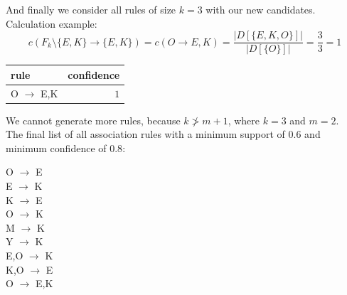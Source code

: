 \documentclass{article}
\begin{document}
  And finally we consider all rules of size $k=3$ with our new candidates. \\

  Calculation example:
  $$c({F}_k \setminus \{E,K\} \to \{E,K\}) = c(O \to E,K) = \dfrac{|D[\{E, K, O\}]|}{|D[\{O\}]|} = \dfrac{3}{3} = 1$$

  \begin{center}
    \begin{tabular}{|l|r|}
      \hline
      \textbf{rule} & \textbf{confidence} \\ \hline
      O $\to$ E,K & \textcolor{OliveGreen}{$1   $} \\ \hline
      \end{tabular}
  \end{center}

  We cannot generate more rules, because $k \ngtr m + 1$, where $k=3$ and $m=2$. \\

  The final list of all association rules with
  a minimum support of $0.6$ and minimum confidence of $0.8$:
  \begin{center}
      O $\to$ E \\
      E $\to$ K \\
      K $\to$ E \\
      O $\to$ K \\
      M $\to$ K \\
      Y $\to$ K \\
      E,O $\to$ K \\
      K,O $\to$ E \\
      O $\to$ E,K \\
  \end{center}
\end{document}
